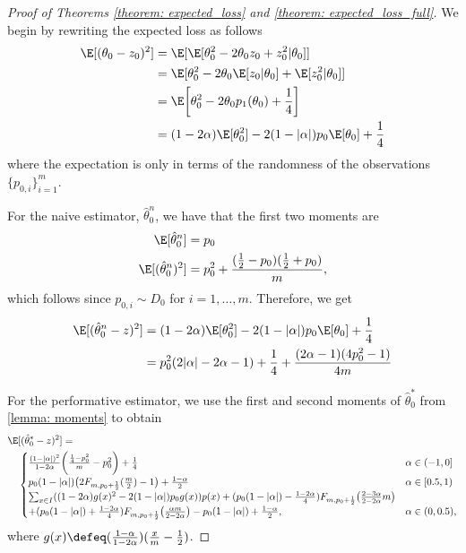\begin{proof}[Proof of Theorems \ref{theorem: expected_loss} and \ref{theorem:
    expected_loss_full}]
    We begin by rewriting the expected loss as follows 
    \begin{align*}
        \E[(\theta_0 - z_0)^2] &= \E[\E[\theta_0^2 - 2\theta_0 z_0 + z_0^2 |
        \theta_0]]\\
        &= \E[\theta_0^2 - 2 \theta_0 \E[z_0 | \theta_0] + \E[z_0^2 |
        \theta_0]]\\
        &= \E\bigg[\theta_0^2 - 2 \theta_0 p_1(\theta_0) + \frac14\bigg]\\
        &=(1-2\alpha)\E[\theta_0^2] - 2 (1 - |\alpha|)p_0 \E[\theta_0] +
        \frac14
    \end{align*}
    where the expectation is only in terms of the randomness of the
    observations $\{p_{0, i} \}_{i=1}^m$.

    For the naive estimator, $\hat{\theta}_0^n$, we have that the first two
    moments are
    \begin{align*}
        \E[\hat{\theta}_0^n] & = p_0\\
        \E[(\hat{\theta}_0^n)^2] &= p_0^2 + \frac{(\frac12 - p_0)(\frac12 +
        p_0)}{m},
    \end{align*} 
    which follows since $p_{0,i} \sim D_0$ for $i = 1, \dots, m$. Therefore, we
    get
    \begin{align*}
        \E[(\hat{\theta}_0^n - z)^2] &=  
        (1-2\alpha)\E[\theta_0^2] - 2 (1 - |\alpha|)p_0 \E[\theta_0] +
        \frac14\\
        &= p_0^2 (2 |\alpha| - 2\alpha - 1) + \frac14 + \frac{(2\alpha - 1)(4
        p_0^2 - 1)}{4m}
    \end{align*}

    For the performative estimator, we use the first and second moments of
    $\hat{\theta}_0^\ast$ from \cref{lemma: moments} to obtain
    \begin{align*}
        \E&[(\hat{\theta}_0^\ast - z)^2] =\\
        &\begin{cases}
            \frac{(1 - |\alpha|)^2}{1-2\alpha} \bigg( \frac{\frac14 - p_0^2}{m}
            - p_0^2 \bigg) + \frac14 & \alpha \in (-1, 0]\\
            p_0 (1 - |\alpha|) \big(2F_{m, p_0 + \frac12}(\frac{m}{2}) - 1\big)
            + \frac{1-\alpha}{2} & \alpha \in [0.5, 1)\\
            \sum_{x \in I}((1 - 2\alpha)g(x)^2 - 2(1 - |\alpha|)p_0 g(x)) p(x) +
            (p_0(1-|\alpha|) - \frac{1-2\alpha}{4})F_{m, p_0 +
            \frac{1}{2}}\bigl(\frac{2 - 3\alpha}{2 - 2\alpha}m \bigr) & \\
            + (p_0(1-|\alpha|) + \frac{1-2\alpha}{4})F_{m, p_0 +
            \frac{1}{2}}\bigl( \frac{\alpha m}{2 - 2\alpha} \bigr) - p_0
            (1-|\alpha|) + \frac{1-\alpha}{2}, & \alpha \in (0, 0.5),
        \end{cases}
    \end{align*}
    where $g(x) \defeq (\frac{1-\alpha}{1-2\alpha})(\frac{x}{m} -
    \frac{1}{2})$.


\end{proof}
